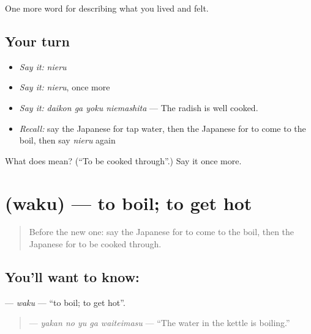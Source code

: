 \begin{grammarlens}[title={What you've built}]
One more word for describing what you lived and felt.
\end{grammarlens}

\subsection*{Your turn}
\begin{itemize}
\raggedright
  \item \emph{Say it:} \emph{nieru}
  \item \emph{Say it:} \emph{nieru}, once more
  \item \emph{Say it:} \emph{daikon ga yoku niemashita} — The radish is well cooked.
  \item \emph{Recall:} say the Japanese for tap water, then the Japanese for to come to the boil, then say \emph{nieru} again
\end{itemize}

\begin{tcolorbox}[breakable,colback=teal!4,colframe=teal!35!black,title={Before you move on}]
What does  mean? (\textquotedblleft{}To be cooked through\textquotedblright{}.) Say it once more.
\end{tcolorbox}
\section[\texorpdfstring{\ja{わく} (waku)}{わく (waku)}]{ (waku) — to boil; to get hot}

\label{lesson:JA-C492-waku}



\begin{quote}
Before the new one: say the Japanese for to come to the boil, then the Japanese for to be cooked through.
\end{quote}

\subsection*{You'll want to know: }
\textbf{} — \emph{waku} — \textquotedblleft{}to boil; to get hot\textquotedblright{}.

\begin{quote}
\textbf{  } — \emph{yakan no yu ga waiteimasu} — \textquotedblleft{}The water in the kettle is boiling.\textquotedblright{}
\end{quote}

